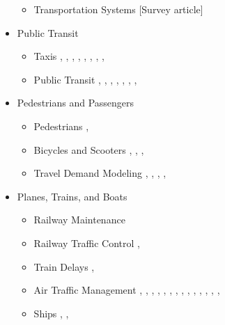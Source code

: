 \begin{itemize}
\begin{itemize}
	\item Transportation Systems [Survey article] 
		\cite{WANG2019144}
	\end{itemize}
	
	\item {Public Transit}
	\begin{itemize}
	\item Taxis
		\cite{CHEN2021103272},
		\cite{JIAO2021103289},
		\cite{KE2021102858},
		\cite{MAO2020102626}, 
		\cite{QIN2021103239},
		\cite{SHOU2020102738}, 
		\cite{TANG2020102844},
		\cite{YU2022103640},
	\item Public Transit
		\cite{CHOW2021103264},
		\cite{FENG2022103611},
		\cite{LIU201918},
		\cite{MULLERHANNEMANN2022103566},
		\cite{TANG2021102951},
		\cite{WANG2019387},
		\cite{WANG2020102661},
		\cite{ZHANG2021102928}
	\end{itemize}

	\item Pedestrians and Passengers
	\begin{itemize}
	\item Pedestrians
		\cite{BUSTOS2021103018},
		\cite{HIDAKA2019115}
	\item Bicycles and Scooters
		\cite{ITO2021103371},
		\cite{LV2021103404},
		\cite{ZUNIGAGARCIA2022103660},
	\item Travel Demand Modeling
		\cite{HAFEZI2021102972},
		\cite{KIM2022103523},
		\cite{LI2021102921},
		\cite{LIU2021103361},
		\cite{PANG2020102706}
	\end{itemize}

	\item {Planes, Trains, and Boats}
	\begin{itemize}
	\item Railway Maintenance
		\cite{ALLAHBUKHSH201935}
	\item Railway Traffic Control
		\cite{GHASEMPOUR202091},
		\cite{TANG2022103679}
	\item Train Delays
		\cite{LI2022103606},
		\cite{NAIR2019196}
	\item Air Traffic Management 
		\cite{BAO2021103323},
		\cite{ALBABA2021103417},
		\cite{CORRADO2021103331},
		\cite{DESHMUKH2021103036},
		\cite{DHIEF2022103704},
		\cite{DU2021103122},
		\cite{KHAN2021103225},
		\cite{OLIVE2020102737},
		\cite{PANG2021103326},
		\cite{PHAM2022103463},
		\cite{SCHULTZ2021103119},
		\cite{VERDONKGALLEGO2019356},
		\cite{WANG2021102892},
		\cite{ZHU2021103179},
	\item Ships
		\cite{GUMUSKAYA2021103383},
		\cite{LU2021102970},
	\end{itemize}
	

\end{itemize}
